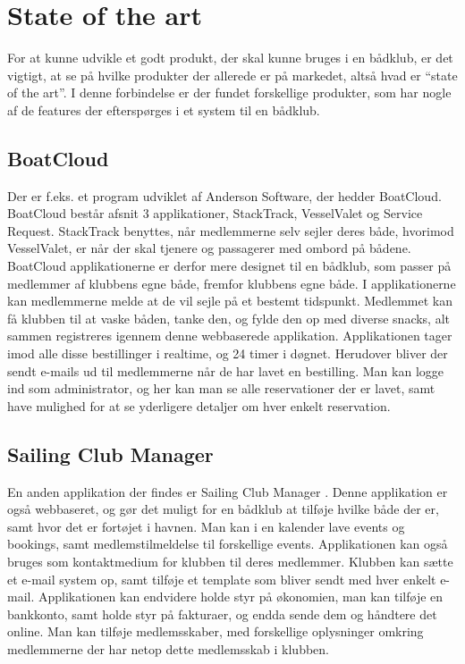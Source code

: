 \section{State of the art}
For at kunne udvikle et godt produkt, der skal kunne bruges i en bådklub, er det vigtigt, at se på hvilke
produkter der allerede er på markedet, altså hvad er ``state of the art''. I denne forbindelse er der fundet
forskellige produkter, som har nogle af de features der efterspørges i et system til en bådklub. 
\newline
\subsection*{BoatCloud}
Der er f.eks.
et program udviklet af Anderson Software, der hedder BoatCloud.\citep{BoatCloud} BoatCloud består afsnit 3
applikationer, StackTrack, VesselValet og Service Request. StackTrack benyttes, når medlemmerne selv sejler
deres både, hvorimod VesselValet, er når der skal tjenere og passagerer med ombord på bådene. 
BoatCloud applikationerne er derfor mere designet til en bådklub, som passer på medlemmer af klubbens egne både, fremfor
klubbens egne både. 
I applikationerne kan medlemmerne melde at de vil sejle på et bestemt tidspunkt. 
Medlemmet kan få klubben til at vaske båden, tanke den, og fylde den op med diverse snacks, alt sammen registreres
igennem denne webbaserede applikation. 
Applikationen tager imod alle disse bestillinger i realtime, og 24 timer i døgnet. 
Herudover bliver der sendt e-mails ud til medlemmerne når de har lavet en bestilling. 
Man kan logge ind som administrator, og her kan man se alle reservationer der er lavet, samt have mulighed for at
se yderligere detaljer om hver enkelt reservation.

\subsection*{Sailing Club Manager}
En anden applikation der findes er Sailing Club Manager \citep{SailClub}. 
Denne applikation er også webbaseret, og gør det muligt for en bådklub at tilføje hvilke både der er, samt hvor det er fortøjet i havnen.
Man kan i en kalender lave events og bookings, samt medlemstilmeldelse til forskellige events. 
Applikationen kan også bruges som kontaktmedium for klubben til deres medlemmer. 
Klubben kan sætte et e-mail system op, samt tilføje et template som bliver sendt med hver enkelt e-mail. 
Applikationen kan endvidere holde styr på økonomien, man kan tilføje en bankkonto, samt  holde styr på fakturaer, og endda sende dem og håndtere det online. 
Man kan tilføje medlemsskaber, med forskellige oplysninger omkring medlemmerne der har netop dette medlemsskab i klubben.

